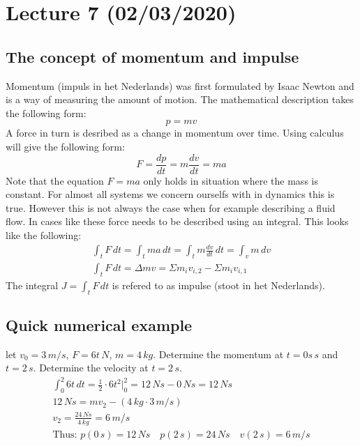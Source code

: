 \documentclass[11pt, a4paper]{article}
\begin{document}
\setcounter{section}{6}
\section{Lecture 7 (02/03/2020)}

\subsection{The concept of momentum and impulse}
Momentum (impuls in het Nederlands) was first formulated by Isaac Newton and is a way of measuring the amount of motion. The mathematical
description takes the following form:
\begin{equation}
  p = mv
\end{equation}
A force in turn is desribed as a change in momentum over time. Using calculus will give the following form:
\begin{equation}
  F = \frac{dp}{dt} = m\frac{dv}{dt} = ma
\end{equation}
Note that the equation $F = ma$ only holds in situation where the mass is constant. For almost all systems
we concern ourselfs with in dynamics this is true. However this is not always the case when for example
describing a fluid flow. In cases like these force needs to be described using an integral. This looks
like the following:
\begin{gather}
  \int_t F\,dt = \int_t ma\,dt = \int_t m\frac{dv}{dt}\,dt = \int_v m\,dv\\
  \int_t F\,dt = \Delta mv = \Sigma m_iv_{i,2} - \Sigma m_iv_{i,1}
\end{gather}
The integral $J = \int_t F\,dt$ is refered to as impulse (stoot in het Nederlands).

\subsection{Quick numerical example}
let $v_0 = 3\,m/s$, $F = 6t\,N$, $m =4\,kg$. Determine the momentum at $t=0s\,s$ and $t=2\,s$. Determine the velocity at $t=2\,s$.
\begin{gather*}
  \int_0^2 6t\,dt = \frac{1}{2} \cdot 6 t^2\Big|_{0}^{2} = 12\,Ns - 0\,Ns = 12\,Ns\\
  12\,Ns = mv_2 - (4\,kg\cdot 3\,m/s)\\
  v_2 = \frac{24\,Ns}{4\,kg} = 6\,m/s\\
  \text{Thus: } p(0\,s) = 12\,Ns \quad  p(2\,s) = 24\,Ns \quad  v(2\,s) = 6\,m/s
\end{gather*}
\end{document}
